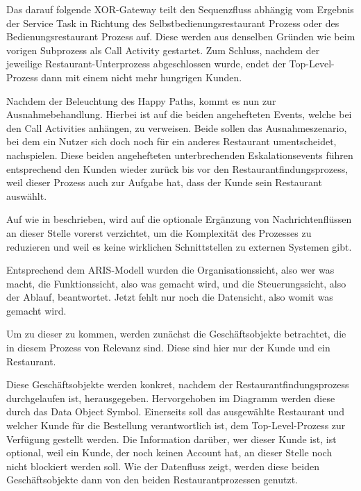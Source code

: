 Das darauf folgende XOR-Gateway teilt den Sequenzfluss abhängig vom Ergebnis der Service Task in Richtung des Selbstbedienungsrestaurant Prozess oder des Bedienungsrestaurant Prozess auf. Diese werden aus denselben Gründen wie beim vorigen Subprozess als Call Activity gestartet. Zum Schluss, nachdem der jeweilige Restaurant-Unterprozess abgeschlossen wurde, endet der Top-Level-Prozess dann mit einem nicht mehr hungrigen Kunden.

Nachdem der Beleuchtung des Happy Paths, kommt es nun zur Ausnahmebehandlung. Hierbei ist auf die beiden angehefteten Events, welche bei den Call Activities anhängen, zu verweisen. Beide sollen das Ausnahmeszenario, bei dem ein Nutzer sich doch noch für ein anderes Restaurant umentscheidet, nachspielen. Diese beiden angehefteten unterbrechenden Eskalationsevents führen entsprechend den Kunden wieder zurück bis vor den Restaurantfindungsprozess, weil dieser Prozess auch zur Aufgabe hat, dass der Kunde sein Restaurant auswählt.

Auf wie in  beschrieben, wird auf die optionale Ergänzung von Nachrichtenflüssen an dieser Stelle vorerst verzichtet, um die Komplexität des Prozesses zu reduzieren und weil es keine wirklichen Schnittstellen zu externen Systemen gibt.

Entsprechend dem ARIS-Modell wurden die Organisationssicht, also wer was macht, die Funktionssicht, also was gemacht wird, und die Steuerungssicht, also der Ablauf, beantwortet. Jetzt fehlt nur noch die Datensicht, also womit was gemacht wird. \citep[vgl.][]{light_aris_2025}

Um zu dieser zu kommen, werden zunächst die Geschäftsobjekte betrachtet, die in diesem Prozess von Relevanz sind. Diese sind hier nur der Kunde und ein Restaurant.

Diese Geschäftsobjekte werden konkret, nachdem der Restaurantfindungsprozess durchgelaufen ist, herausgegeben. Hervorgehoben im Diagramm werden diese durch das Data Object Symbol. Einerseits soll das ausgewählte Restaurant und welcher Kunde für die Bestellung verantwortlich ist, dem Top-Level-Prozess zur Verfügung gestellt werden. Die Information darüber, wer dieser Kunde ist, ist optional, weil ein Kunde, der noch keinen Account hat, an dieser Stelle noch nicht blockiert werden soll. Wie der Datenfluss zeigt, werden diese beiden Geschäftsobjekte dann von den beiden Restaurantprozessen genutzt.

